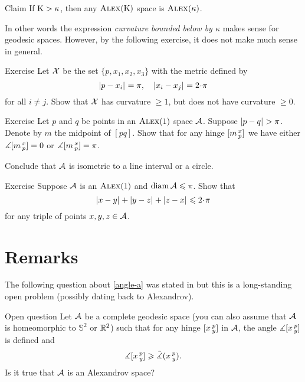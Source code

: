 \begin{thm}{Claim}\label{clm:K>k}
If $\mathrm{K}>\kappa$, then any $\textsc{Alex}(\mathrm{K})$ space is $\textsc{Alex}(\kappa)$.
\end{thm}

In other words the expression \textit{curvature bounded below by $\kappa$} makes sense for geodesic spaces.
However, by the following exercise, it does not make much sense in general.

\begin{thm}{Exercise}\label{ex:CBB(1)notitCBB(0)}
Let $\mathcal{X}$ be the set $\{p,x_1,x_2,x_3\}$ with the metric defined by
\[\dist{p}{x_i}{}=\pi,\quad\dist{x_i}{x_j}{}=2\cdot\pi\]
for all $i\ne j$.
Show that $\mathcal{X}$ has curvature $\ge 1$, but does not have curvature $\ge 0$.
\end{thm}

\begin{thm}{Exercise}\label{ex:RisCBB(1)}
Let $p$ and $q$ be points in an $\textsc{Alex}(1)$ space $\mathcal{A}$.
Suppose $|{p}-{q}|_{}^{{}}>\pi$.
Denote by $m$ the midpoint of $[pq]$.
Show that for any hinge $[m\,{}^{x}_{p}]$ we have
either $\measuredangle[m\,{}^{x}_{p}]=0$ or $\measuredangle[m\,{}^{x}_{p}]=\pi$.

Conclude that $\mathcal{A}$ is isometric to a line interval or a circle.

\end{thm}

\begin{thm}{Exercise}\label{ex:perim-k>0}
Suppose  
$\mathcal{A}$ is an $\textsc{Alex}(1)$
and $\operatorname{\rm diam}\nolimits \mathcal{A}\leqslant \pi$.
Show that 
\[\dist{x}{y}{}+\dist{y}{z}{}+\dist{z}{x}{}\le 2\cdot\pi\]
for any triple of points $x,y,z\in \mathcal{A}$.
\end{thm}


\section{Remarks}

The following question about \ref{angle-a} was stated in \cite[footnote in 4.1.5]{burago-burago-ivanov} but this is a long-standing open problem (possibly dating back to Alexandrov).

\begin{thm}{Open question}\label{open:hinge-}
Let $\mathcal{A}$ be a complete geodesic space (you can also assume that $\mathcal{A}$ is homeomorphic to $\mathbb{S}^2$ or $\mathbb{R}^2$) 
such that for any hinge $[x\,{}^{p}_{y}]$ in $\mathcal{A}$, 
the angle $\measuredangle[x\,{}^{p}_{y}]$ is defined and 
\[\measuredangle[x\,{}^{p}_{y}]\geqslant\tilde\measuredangle(x\,{}^{p}_{y}).\]
Is it true that $\mathcal{A}$ is an Alexandrov space?
\end{thm}

